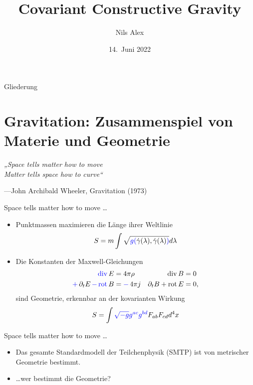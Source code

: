 \documentclass{beamer}
\title{Covariant Constructive Gravity}
\date{14.\ Juni 2022}
\author{Nils Alex}
\institute{FAU Erlangen-Nürnberg}
\begin{document}
    \maketitle

    \begin{frame}{Gliederung}
        \tableofcontents[pausesections]
    \end{frame}


    \section{Gravitation: Zusammenspiel von Materie und Geometrie}\label{sec:materie-und-geometrie}

    \begin{frame}{}
        \Large
        \textit{„Space tells matter how to move \\
        Matter tells space how to curve“}

        \normalsize
        ---John Archibald Wheeler, Gravitation (1973)
    \end{frame}

    \begin{frame}{Space tells matter how to move \ldots}
        \begin{itemize}
            \item {\setlength{\belowdisplayskip}{-5pt}Punktmassen maximieren die {\color{blue}Länge} ihrer Weltlinie
                \[ S = m \int \sqrt{{\color{blue}g(}\dot\gamma(\lambda),\dot\gamma(\lambda){\color{blue})}} d\lambda \]} \pause
            \item Die Konstanten der Maxwell-Gleichungen
            \begin{align*}
                \mathop{\color{blue}\operatorname{div}} E &= 4\pi \rho & \operatorname{div} B &= 0 \\
                \mathop{\color{blue}+} \partial_t E \mathop{\color{blue}-} \mathop{\color{blue}\operatorname{rot}} B &= \mathop{\color{blue}-}4\pi j & \partial_t B + \operatorname{rot} E &= 0,
            \end{align*}
            sind Geometrie, erkennbar an der kovarianten Wirkung
            \[
                S = \int {\color{blue}\sqrt{-g}g^{ac}g^{bd}} F_{ab} F_{cd} d^4 x
            \]
        \end{itemize}
    \end{frame}

    \begin{frame}{Space tells matter how to move \ldots}
        \begin{itemize}
            \item Das gesamte Standardmodell der Teilchenphysik (SMTP) ist von metrischer Geometrie bestimmt. \pause
            \item \ldots wer bestimmt die Geometrie?
        \end{itemize}
    \end{frame}
\end{document}
